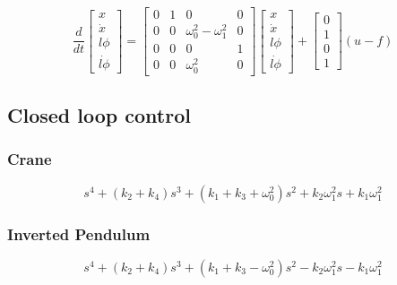 \documentclass{article}
\begin{document}
\begin{equation}
  \frac{d}{dt} 
  \begin{bmatrix}
     x \\ \dot{x} \\ l\phi \\ \dot{l\phi} \end{bmatrix} = \begin{bmatrix} 
      0 & 1 & 0 & 0 \\ 0 & 0 & \omega_0^2 - \omega_1^2 & 0 \\ 0 & 0 & 0 & 1 \\ 0 & 0 & \omega_0^2 & 0 \end{bmatrix} \begin{bmatrix} 
        x \\ \dot{x} \\ l\phi \\ \dot{l\phi} \end{bmatrix} + \begin{bmatrix} 
          0 \\ 1 \\ 0 \\ 1 \end{bmatrix} (u - f)
\end{equation}

\subsection{Closed loop control}


\subsubsection{Crane}


\begin{equation}
  s^{4} + \left(k_{2} + k_{4}\right) s^{3} + \left(k_{1} + k_{3} + \omega_{0}^{2}\right) s^{2} + k_{2} \omega_{1}^{2} s + k_{1} \omega_{1}^{2}
\end{equation}

\subsubsection{Inverted Pendulum}

\begin{equation}
  s^{4} + \left(k_{2} + k_{4}\right) s^{3} + \left(k_{1} + k_{3} - \omega_{0}^{2}\right) s^{2} -  k_{2} \omega_{1}^{2} s -  k_{1} \omega_{1}^{2}
\end{equation}
\end{document}
